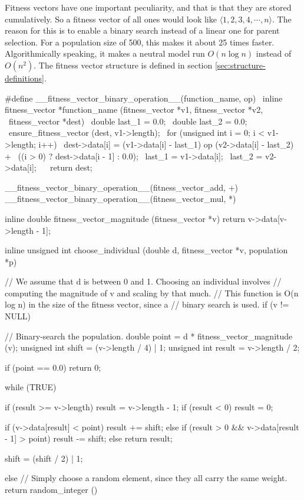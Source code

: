 \documentclass{article}
\begin{document}
      Fitness vectors have one important peculiarity, and that is that they are
      stored cumulatively. So a fitness vector of all ones would look like
      $\langle 1, 2, 3, 4, \cdots, n \rangle$. The reason for this is to enable
      a binary search instead of a linear one for parent selection. For a
      population size of 500, this makes it about 25 times faster.
      Algorithmically speaking, it makes a neutral model run $O(n \log n)$
      instead of $O(n^2)$. The fitness vector structure is defined in section
      \ref{sec:structure-definitions}.

\begin{ccode}
#define __fitness_vector_binary_operation__(function_name, op) \
inline fitness_vector *function_name (fitness_vector *v1, fitness_vector *v2, \
				      fitness_vector *dest) { \
  double last_1 = 0.0; \
  double last_2 = 0.0; \
  ensure_fitness_vector (dest, v1->length); \
  for (unsigned int i = 0; i < v1->length; i++) { \
   dest->data[i] = (v1->data[i] - last_1) op (v2->data[i] - last_2) + \
     ((i > 0) ? dest->data[i - 1] : 0.0); \
   last_1 = v1->data[i]; \
   last_2 = v2->data[i]; \
  } \
  return dest; \
}

__fitness_vector_binary_operation__(fitness_vector_add, +)
__fitness_vector_binary_operation__(fitness_vector_mul, *)

inline double fitness_vector_magnitude (fitness_vector *v)
  {return v->data[v->length - 1];}

inline unsigned int choose_individual (double d, fitness_vector *v, population *p) {
  // We assume that d is between 0 and 1. Choosing an individual involves
  // computing the magnitude of v and scaling by that much.
  // This function is O(n log n) in the size of the fitness vector, since a
  // binary search is used.
  if (v != NULL) {
    // Binary-search the population.
    double		point 	= d * fitness_vector_magnitude (v);
    unsigned int	shift 	= (v->length / 4) | 1;
    unsigned int	result 	= v->length / 2;

    if (point == 0.0)
      return 0;

    while (TRUE) {
      if (result >= v->length)	result = v->length - 1;
      if (result < 0)		result = 0;

      if (v->data[result] < point)
	result += shift;
      else if (result > 0 && v->data[result - 1] > point)
	result -= shift;
      else
	return result;

      shift = (shift / 2) | 1;
    }
  } else
    // Simply choose a random element, since they all carry the same weight.
    return random_integer () %
}
\end{ccode}
\end{document}
